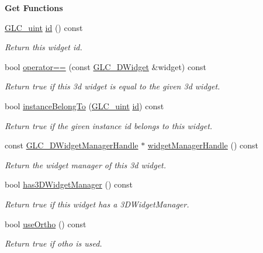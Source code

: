 \begin{Indent}{\bf Get Functions}\par
\begin{DoxyCompactItemize}
\item 
\hyperlink{glc__global_8h_abf950976fabed69026558df8e2da6c6b}{G\-L\-C\-\_\-uint} \hyperlink{class_g_l_c__3_d_widget_a61a374e38f6d0f2966d02b6975884cbd}{id} () const 
\begin{DoxyCompactList}\small\item\em Return this widget id. \end{DoxyCompactList}\item 
bool \hyperlink{class_g_l_c__3_d_widget_abb3785c2202501b0c4f3b286d383aade}{operator==} (const \hyperlink{class_g_l_c__3_d_widget}{G\-L\-C\-\_\-D\-Widget} \&widget) const 
\begin{DoxyCompactList}\small\item\em Return true if this 3d widget is equal to the given 3d widget. \end{DoxyCompactList}\item 
bool \hyperlink{class_g_l_c__3_d_widget_aab48ceca10a4de18e1bff5b952aef9e3}{instance\-Belong\-To} (\hyperlink{glc__global_8h_abf950976fabed69026558df8e2da6c6b}{G\-L\-C\-\_\-uint} \hyperlink{glext_8h_a58c2a664503e14ffb8f21012aabff3e9}{id}) const 
\begin{DoxyCompactList}\small\item\em Return true if the given instance id belongs to this widget. \end{DoxyCompactList}\item 
const \hyperlink{class_g_l_c__3_d_widget_manager_handle}{G\-L\-C\-\_\-D\-Widget\-Manager\-Handle} $\ast$ \hyperlink{class_g_l_c__3_d_widget_ac165ac886af004926730e40749c1eb9b}{widget\-Manager\-Handle} () const 
\begin{DoxyCompactList}\small\item\em Return the widget manager of this 3d widget. \end{DoxyCompactList}\item 
bool \hyperlink{class_g_l_c__3_d_widget_ab76620098090f518ec33e75eae89896b}{has3\-D\-Widget\-Manager} () const 
\begin{DoxyCompactList}\small\item\em Return true if this widget has a 3\-D\-Widget\-Manager. \end{DoxyCompactList}\item 
bool \hyperlink{class_g_l_c__3_d_widget_a843cbd8f8d7e8225ec6c4801f6e684e9}{use\-Ortho} () const 
\begin{DoxyCompactList}\small\item\em Return true if otho is used. \end{DoxyCompactList}\end{DoxyCompactItemize}
\end{Indent}
